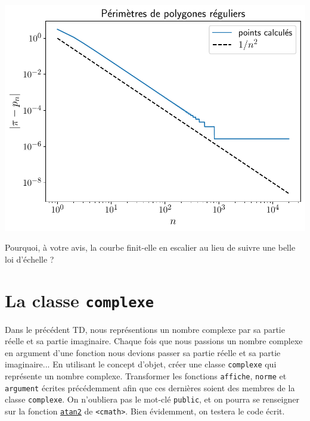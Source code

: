 \documentclass{book}
\newcommand{\inline}[1]{\texttt{#1}}
\begin{document}
\begin{correction}
\begin{center}
\includegraphics[width=0.45\paperwidth]{TD2/perimetres-polygones-reguliers.pdf}
\end{center}

Pourquoi, à votre avis, la courbe finit-elle en escalier au lieu de suivre une belle loi d'échelle ?

\end{correction}

\section{La classe \texttt{complexe}}
 
Dans le précédent TD, nous représentions un nombre complexe par sa partie réelle et sa partie imaginaire. Chaque fois que nous passions un nombre complexe en argument d'une fonction nous devions passer sa partie réelle et sa partie imaginaire... En utilisant le concept d'objet, créer une classe \inline{complexe} qui représente un nombre complexe. Transformer les fonctions \inline{affiche}, \inline{norme} et \inline{argument} écrites précédemment afin que ces dernières soient des membres de la classe \inline{complexe}. On n'oubliera pas le mot-clé \inline{public}, et on pourra se renseigner sur la fonction \href{http://en.cppreference.com/w/cpp/numeric/math/atan2}{\inline{atan2}} de \inline{<cmath>}. Bien évidemment, on testera le code écrit.
\end{document}
